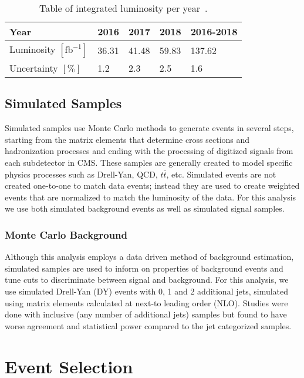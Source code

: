 \begin{table}[h]
	\centering
	\caption[Table of integrated luminosity per year~\cite{cmslumi2016,cmslumi2017,cmslumi2018}.]{Table of integrated luminosity per year~\cite{cmslumi2016,cmslumi2017,cmslumi2018}.}
	\label{tab:intLumi}
		\begin{tabular}{l|l|l|l|l}\hline
			Year & 2016 & 2017 & 2018 & 2016-2018\\
			\hline
			\hline
			Luminosity $[\text{fb}^{-1}]$ & 36.31 & 41.48 & 59.83 & 137.62\\
			\hline	
			Uncertainty $[\%]$ & 1.2 & 2.3 & 2.5 & 1.6\\
			\hline
		\end{tabular}
\end{table}

\subsection{Simulated Samples} \label{sec:ana_mc}
Simulated samples use Monte Carlo methods to generate events in several steps, starting from the matrix elements that determine cross sections and hadronization processes and ending with the processing of digitized signals from each subdetector in CMS. These samples are generally created to model specific physics processes such as Drell-Yan, QCD, $t\bar{t}$, etc. Simulated events are not created one-to-one to match data events; instead they are used to create weighted events that are normalized to match the luminosity of the data. For this analysis we use both simulated background events as well as simulated signal samples.

\subsubsection{Monte Carlo Background} \label{sec:ana_mcbkg}
Although this analysis employs a data driven method of background estimation, simulated samples are used to inform on properties of background events and tune cuts to discriminate between signal and background. For this analysis, we use simulated Drell-Yan (DY) events with 0, 1 and 2 additional jets, simulated using matrix elements calculated at next-to leading order (NLO). Studies were done with inclusive (any number of additional jets) samples but found to have worse agreement and statistical power compared to the jet categorized samples.

\section{Event Selection} \label{sec:ana_eventsel}
